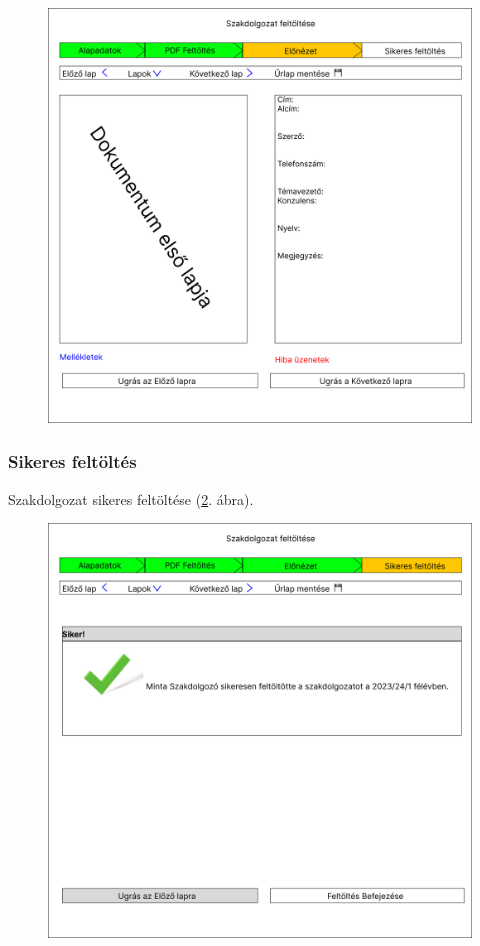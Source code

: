 \documentclass[a4paper,12pt]{article}
\begin{document}
\begin{figure}
	\centering
	\includegraphics[width=\textwidth]{images/Web_pages/Preview.jpg}
	\caption{}
	\label{fig:Preview}
\end{figure}

\subsubsection{Sikeres feltöltés}

Szakdolgozat sikeres feltöltése (\ref{fig:Completed}. ábra).

\begin{figure}
	\centering
	\includegraphics[width=\textwidth]{images/Web_pages/Completed.jpg}
	\caption{}
	\label{fig:Completed}
\end{figure}
\end{document}
